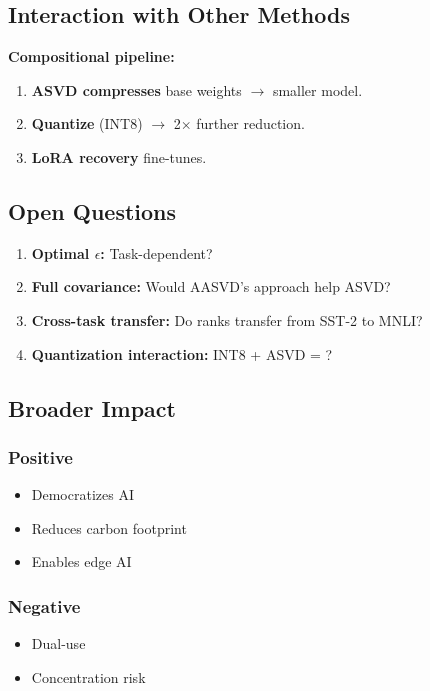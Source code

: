 \subsection{Interaction with Other Methods}

\textbf{Compositional pipeline:}

\begin{enumerate}
\item \textbf{ASVD compresses} base weights $\to$ smaller model.
\item \textbf{Quantize} (INT8) $\to$ 2$\times$ further reduction.
\item \textbf{LoRA recovery} fine-tunes.

\end{enumerate}
\subsection{Open Questions}

\begin{enumerate}
\item \textbf{Optimal $\epsilon$:} Task-dependent?
\item \textbf{Full covariance:} Would AASVD's approach help ASVD?
\item \textbf{Cross-task transfer:} Do ranks transfer from SST-2 to MNLI?
\item \textbf{Quantization interaction:} INT8 + ASVD = ?

\end{enumerate}
\subsection{Broader Impact}

\subsubsection{Positive}
\begin{itemize}
\item Democratizes AI
\item Reduces carbon footprint
\item Enables edge AI

\end{itemize}
\subsubsection{Negative}
\begin{itemize}
\item Dual-use
\item Concentration risk

\end{itemize}
